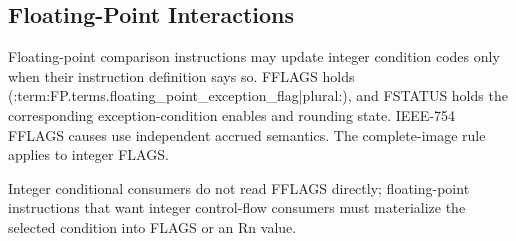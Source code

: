 \subsection{Floating-Point Interactions}
Floating-point comparison instructions may update integer condition codes only when their instruction definition says
so. FFLAGS holds (:term:FP.terms.floating_point_exception_flag|plural:), and FSTATUS holds the corresponding exception-condition enables
and rounding state. IEEE-754 FFLAGS causes use independent accrued semantics. The complete-image rule applies to
integer FLAGS.

Integer conditional consumers do not read FFLAGS directly; floating-point instructions that want integer control-flow
consumers must materialize the selected condition into FLAGS or an Rn value.
